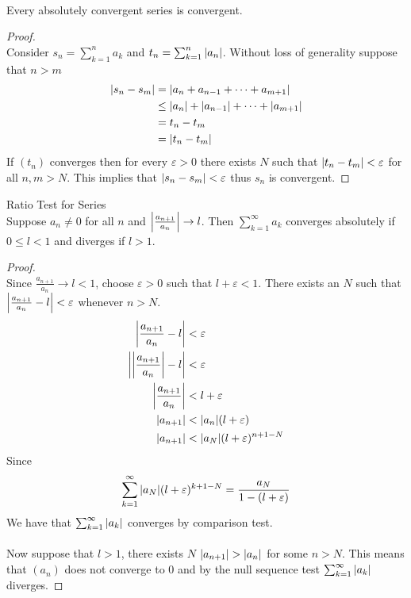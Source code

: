 \documentclass[a4paper]{article}
\begin{document}
\begin{thm}{}{}\\ Every absolutely convergent series is convergent.
\begin{proof}\\ Consider $s_n=\sum_{k=1}^na_k$ and $t_n=\sum_{k=1}^n\abs{a_n}$. Without loss of generality suppose that $n>m$
\begin{align*}
\abs{s_n-s_m}&=\abs{a_n+a_{n-1}+\dots+a_{m+1}}\\
&\leq \abs{a_n}+\abs{a_{n-1}}+\dots+\abs{a_{m+1}}\\
&=t_n-t_m\\
&=\abs{t_n-t_m}
\end{align*}
If $(t_n)$ converges then for every $\varepsilon>0$ there exists $N$ such that $\abs{t_n-t_m}<\varepsilon$ for all $n,m>N$. This implies that $\abs{s_n-s_m}<\varepsilon$ thus $s_n$ is convergent. 
\end{proof}
\end{thm}

\begin{thm}{Ratio Test for Series}{}\\ Suppose $a_n\neq0$ for all $n$ and $\abs{\frac{a_{n+1}}{a_n}}\to l$. Then $\sum_{k=1}^{\infty}a_k$ converges absolutely if $0\leq l<1$ and diverges if $l>1$. 
\begin{proof}\\
Since $\frac{a_{n+1}}{a_n}\to l<1$, choose $\varepsilon>0$ such that $l+\varepsilon<1$. There exists an $N$ such that $\abs{\frac{a_{n+1}}{a_n}-l}<\varepsilon$ whenever $n>N$. 
\begin{align*}
\abs{\frac{a_{n+1}}{a_n}-l}&<\varepsilon\\
\abs{\abs{\frac{a_{n+1}}{a_n}}-l}&<\varepsilon\\
\abs{\frac{a_{n+1}}{a_n}}&<l+\varepsilon\\
\abs{a_{n+1}}&<\abs{a_n}(l+\varepsilon)\\
\abs{a_{n+1}}&<\abs{a_N}(l+\varepsilon)^{n+1-N}\\
\end{align*}
Since $$\sum_{k=1}^{\infty}\abs{a_N}(l+\varepsilon)^{k+1-N}=\frac{a_N}{1-(l+\varepsilon)}$$ We have that $\sum_{k=1}^{\infty}\abs{a_k}$ converges by comparison test. \\~\\
Now suppose that $l>1$, there exists $N$ $\abs{a_{n+1}}>\abs{a_n}$ for some $n>N$. This means that $(a_n)$ does not converge to $0$ and by the null sequence test $\sum_{k=1}^{\infty}\abs{a_k}$ diverges. 
\end{proof}
\end{thm}
\end{document}
